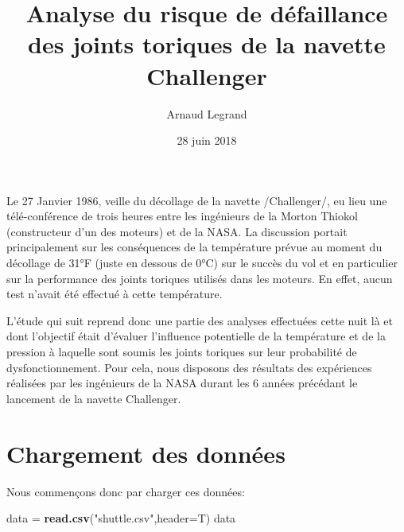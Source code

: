 \documentclass[]{article}
\title{Analyse du risque de défaillance des joints toriques de la navette
Challenger}
\author{Arnaud Legrand}
\date{28 juin 2018}
\newenvironment{Shaded}{\begin{snugshade}}{\end{snugshade}}
\newcommand{\DataTypeTok}[1]{\textcolor[rgb]{0.13,0.29,0.53}{#1}}
\newcommand{\KeywordTok}[1]{\textcolor[rgb]{0.13,0.29,0.53}{\textbf{#1}}}
\newcommand{\NormalTok}[1]{#1}
\newcommand{\StringTok}[1]{\textcolor[rgb]{0.31,0.60,0.02}{#1}}
\begin{document}
\maketitle

Le 27 Janvier 1986, veille du décollage de la navette /Challenger/, eu
lieu une télé-conférence de trois heures entre les ingénieurs de la
Morton Thiokol (constructeur d'un des moteurs) et de la NASA. La
discussion portait principalement sur les conséquences de la température
prévue au moment du décollage de 31°F (juste en dessous de 0°C) sur le
succès du vol et en particulier sur la performance des joints toriques
utilisés dans les moteurs. En effet, aucun test n'avait été effectué à
cette température.

L'étude qui suit reprend donc une partie des analyses effectuées cette
nuit là et dont l'objectif était d'évaluer l'influence potentielle de la
température et de la pression à laquelle sont soumis les joints toriques
sur leur probabilité de dysfonctionnement. Pour cela, nous disposons des
résultats des expériences réalisées par les ingénieurs de la NASA durant
les 6 années précédant le lancement de la navette Challenger.

\hypertarget{chargement-des-donnees}{%
\section{Chargement des données}\label{chargement-des-donnees}}

Nous commençons donc par charger ces données:

\begin{Shaded}
\begin{Highlighting}[]
\NormalTok{data =}\StringTok{ }\KeywordTok{read.csv}\NormalTok{(}\StringTok{"shuttle.csv"}\NormalTok{,}\DataTypeTok{header=}\NormalTok{T)}
\NormalTok{data}
\end{Highlighting}
\end{Shaded}
\end{document}
